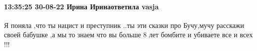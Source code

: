  
 
 
 
 

\paragraph{13:35:25 30-08-22 Ирина Иринаответила vasja}

Я поняла ,что ты нацист и преступник ..ты эти сказки про Бучу,мучу расскажи
своей бабушке ,а мы то знаем что вы больше 8 лет бомбите и убиваете все и всех
!!!
